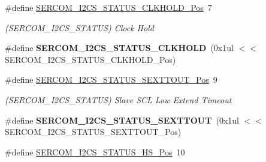 \begin{DoxyCompactItemize}
\item 
\hypertarget{group___s_a_m_l21___s_e_r_c_o_m_ga9552eca7b2b5b829314b8ff8fedce2db}{}\#define \hyperlink{group___s_a_m_l21___s_e_r_c_o_m_ga9552eca7b2b5b829314b8ff8fedce2db}{S\+E\+R\+C\+O\+M\+\_\+\+I2\+C\+S\+\_\+\+S\+T\+A\+T\+U\+S\+\_\+\+C\+L\+K\+H\+O\+L\+D\+\_\+\+Pos}~7\label{group___s_a_m_l21___s_e_r_c_o_m_ga9552eca7b2b5b829314b8ff8fedce2db}

\begin{DoxyCompactList}\small\item\em (S\+E\+R\+C\+O\+M\+\_\+\+I2\+C\+S\+\_\+\+S\+T\+A\+T\+U\+S) Clock Hold \end{DoxyCompactList}\item 
\hypertarget{group___s_a_m_l21___s_e_r_c_o_m_ga47182055e0059085d957a8cd9b432b1f}{}\#define {\bfseries S\+E\+R\+C\+O\+M\+\_\+\+I2\+C\+S\+\_\+\+S\+T\+A\+T\+U\+S\+\_\+\+C\+L\+K\+H\+O\+L\+D}~(0x1ul $<$$<$ S\+E\+R\+C\+O\+M\+\_\+\+I2\+C\+S\+\_\+\+S\+T\+A\+T\+U\+S\+\_\+\+C\+L\+K\+H\+O\+L\+D\+\_\+\+Pos)\label{group___s_a_m_l21___s_e_r_c_o_m_ga47182055e0059085d957a8cd9b432b1f}

\item 
\hypertarget{group___s_a_m_l21___s_e_r_c_o_m_gaff9d0eef7f15a4eff5e38616c1ea913b}{}\#define \hyperlink{group___s_a_m_l21___s_e_r_c_o_m_gaff9d0eef7f15a4eff5e38616c1ea913b}{S\+E\+R\+C\+O\+M\+\_\+\+I2\+C\+S\+\_\+\+S\+T\+A\+T\+U\+S\+\_\+\+S\+E\+X\+T\+T\+O\+U\+T\+\_\+\+Pos}~9\label{group___s_a_m_l21___s_e_r_c_o_m_gaff9d0eef7f15a4eff5e38616c1ea913b}

\begin{DoxyCompactList}\small\item\em (S\+E\+R\+C\+O\+M\+\_\+\+I2\+C\+S\+\_\+\+S\+T\+A\+T\+U\+S) Slave S\+C\+L Low Extend Timeout \end{DoxyCompactList}\item 
\hypertarget{group___s_a_m_l21___s_e_r_c_o_m_gae07ea6175bbdb7377bd602ac1d801b1a}{}\#define {\bfseries S\+E\+R\+C\+O\+M\+\_\+\+I2\+C\+S\+\_\+\+S\+T\+A\+T\+U\+S\+\_\+\+S\+E\+X\+T\+T\+O\+U\+T}~(0x1ul $<$$<$ S\+E\+R\+C\+O\+M\+\_\+\+I2\+C\+S\+\_\+\+S\+T\+A\+T\+U\+S\+\_\+\+S\+E\+X\+T\+T\+O\+U\+T\+\_\+\+Pos)\label{group___s_a_m_l21___s_e_r_c_o_m_gae07ea6175bbdb7377bd602ac1d801b1a}

\item 
\hypertarget{group___s_a_m_l21___s_e_r_c_o_m_gad76db48db6185cc84e155350c2b02e64}{}\#define \hyperlink{group___s_a_m_l21___s_e_r_c_o_m_gad76db48db6185cc84e155350c2b02e64}{S\+E\+R\+C\+O\+M\+\_\+\+I2\+C\+S\+\_\+\+S\+T\+A\+T\+U\+S\+\_\+\+H\+S\+\_\+\+Pos}~10\label{group___s_a_m_l21___s_e_r_c_o_m_gad76db48db6185cc84e155350c2b02e64}


\end{DoxyCompactItemize}
